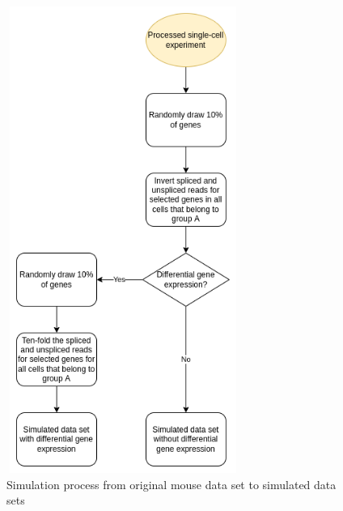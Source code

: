 \begin{figure}[!htb]
\begin{center}
\includegraphics[width=3in,height=6in]{../figures/kidney_mouse/first_simulation_process.png}
\end{center}
\caption{Simulation process from original mouse data set to simulated data sets}
\label{fig:simulation_process}
\end{figure}

